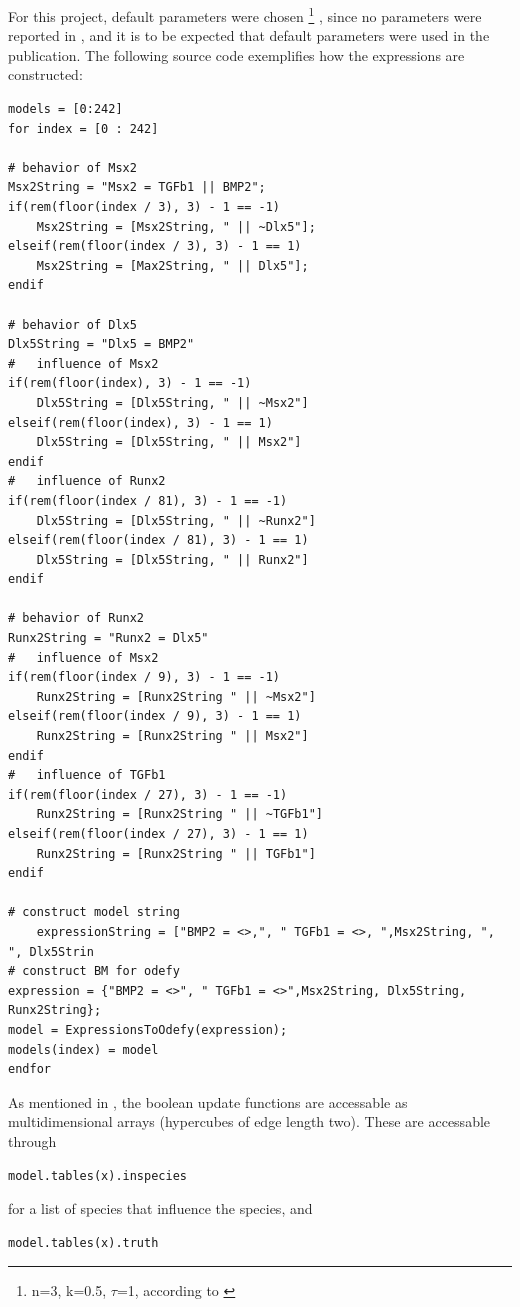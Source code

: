\documentclass[11pt]{article}
\begin{document}
For this project, default parameters were chosen \footnote{n=3, k=0.5, $\tau$=1, according to \cite{Krumsiek}} , since no parameters were reported in \cite{Kirkham}, and it is to be expected that default parameters were used in the publication. The following source code exemplifies how the expressions are constructed:

\begin{lstlisting}
models = [0:242]
for index = [0 : 242]

# behavior of Msx2
Msx2String = "Msx2 = TGFb1 || BMP2";
if(rem(floor(index / 3), 3) - 1 == -1)
	Msx2String = [Msx2String, " || ~Dlx5"];
elseif(rem(floor(index / 3), 3) - 1 == 1)
	Msx2String = [Max2String, " || Dlx5"];
endif

# behavior of Dlx5
Dlx5String = "Dlx5 = BMP2"
#	influence of Msx2
if(rem(floor(index), 3) - 1 == -1)
	Dlx5String = [Dlx5String, " || ~Msx2"]
elseif(rem(floor(index), 3) - 1 == 1)
	Dlx5String = [Dlx5String, " || Msx2"]
endif
#	influence of Runx2
if(rem(floor(index / 81), 3) - 1 == -1)
	Dlx5String = [Dlx5String, " || ~Runx2"]
elseif(rem(floor(index / 81), 3) - 1 == 1)
	Dlx5String = [Dlx5String, " || Runx2"]
endif

# behavior of Runx2
Runx2String = "Runx2 = Dlx5"
#	influence of Msx2
if(rem(floor(index / 9), 3) - 1 == -1)
	Runx2String = [Runx2String " || ~Msx2"]
elseif(rem(floor(index / 9), 3) - 1 == 1)
	Runx2String = [Runx2String " || Msx2"]
endif
#	influence of TGFb1
if(rem(floor(index / 27), 3) - 1 == -1)
	Runx2String = [Runx2String " || ~TGFb1"]
elseif(rem(floor(index / 27), 3) - 1 == 1)
	Runx2String = [Runx2String " || TGFb1"]
endif

# construct model string
	expressionString = ["BMP2 = <>,", " TGFb1 = <>, ",Msx2String, ", ", Dlx5Strin
# construct BM for odefy
expression = {"BMP2 = <>", " TGFb1 = <>",Msx2String, Dlx5String, Runx2String};
model = ExpressionsToOdefy(expression);
models(index) = model
endfor
\end{lstlisting}

As mentioned in \cite{Krumsiek}, the boolean update functions are accessable as multidimensional arrays (hypercubes of edge length two). These are accessable through
\begin{lstlisting}
model.tables(x).inspecies
\end{lstlisting}

for a list of species that influence the species, and
\begin{lstlisting}
model.tables(x).truth
\end{lstlisting}
\end{document}
